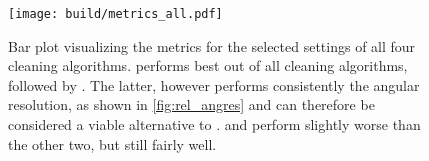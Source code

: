 \begin{figure}
    \centering
    \texttt{[image: build/metrics\_all.pdf]}
    \caption{Bar plot visualizing the metrics for the selected settings of all four cleaning algorithms.
    \fact{} performs best out of all cleaning algorithms, followed by \mars{}. The latter, however
    performs consistently \wrt the angular resolution, as shown in \autoref{fig:rel_angres} and can therefore be considered
    a viable alternative to \fact{}. \tailcuts{} and \fact{} perform slightly worse than the other two, but still fairly well.}%
    \label{fig:metrics_all}
\end{figure}
